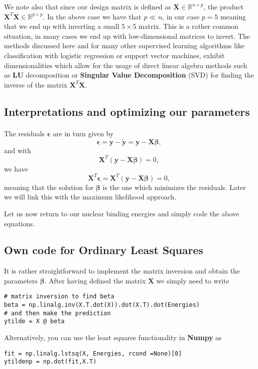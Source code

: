 \documentclass[%
oneside,                 %
final,                   %
10pt]{article}
\begin{document}
We note also that since our design matrix is defined as $\bm{X}\in
{\mathbb{R}}^{n\times p}$, the product $\bm{X}^T\bm{X} \in
{\mathbb{R}}^{p\times p}$.  In the above case we have that $p \ll n$,
in our case $p=5$ meaning that we end up with inverting a small
$5\times 5$ matrix. This is a rather common situation, in many cases we end up with low-dimensional
matrices to invert. The methods discussed here and for many other
supervised learning algorithms like classification with logistic
regression or support vector machines, exhibit dimensionalities which
allow for the usage of direct linear algebra methods such as \textbf{LU} decomposition or \textbf{Singular Value Decomposition} (SVD) for finding the inverse of the matrix
$\bm{X}^T\bm{X}$.



\subsection*{Interpretations and optimizing our parameters}

\paragraph{}
The residuals $\bm{\epsilon}$ are in turn given by
\[
\bm{\epsilon} = \bm{y}-\bm{\tilde{y}} = \bm{y}-\bm{X}\bm{\beta},
\]
and with 
\[
\bm{X}^T\left( \bm{y}-\bm{X}\bm{\beta}\right)= 0, 
\]
we have
\[
\bm{X}^T\bm{\epsilon}=\bm{X}^T\left( \bm{y}-\bm{X}\bm{\beta}\right)= 0, 
\]
meaning that the solution for $\bm{\beta}$ is the one which minimizes the residuals.  Later we will link this with the maximum likelihood approach.




Let us now return to our nuclear binding energies and simply code the above equations. 

\subsection*{Own code for Ordinary Least Squares}

It is rather straightforward to implement the matrix inversion and obtain the parameters $\bm{\beta}$. After having defined the matrix $\bm{X}$ we simply need to 
write
\begin{verbatim}
# matrix inversion to find beta
beta = np.linalg.inv(X.T.dot(X)).dot(X.T).dot(Energies)
# and then make the prediction
ytilde = X @ beta
\end{verbatim}
Alternatively, you can use the least squares functionality in \textbf{Numpy} as
\begin{verbatim}
fit = np.linalg.lstsq(X, Energies, rcond =None)[0]
ytildenp = np.dot(fit,X.T)
\end{verbatim}
\end{document}
